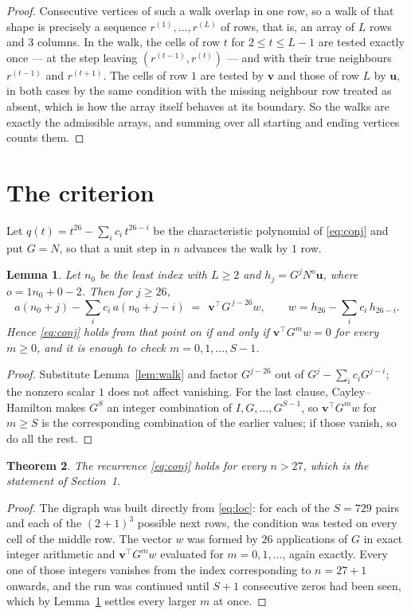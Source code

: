 \documentclass[11pt,a4paper]{article}
\theoremstyle{plain}
\newtheorem{theorem}{Theorem}
\newtheorem{lemma}[theorem]{Lemma}
\theoremstyle{definition}
\begin{document}
\begin{proof}
Consecutive vertices of such a walk overlap in one row, so a walk of that shape is
precisely a sequence $r^{(1)},\dots,r^{(L)}$ of rows, that is, an array of $L$ rows
and $3$ columns. In the walk, the cells of row $t$ for $2\le t\le L-1$ are tested
exactly once --- at the step leaving $(r^{(t-1)},r^{(t)})$ --- and with their true
neighbours $r^{(t-1)}$ and $r^{(t+1)}$. The cells of row $1$ are tested by
$\mathbf{v}$ and those of row $L$ by $\mathbf{u}$, in both cases by the same condition
with the missing neighbour row treated as absent, which is how the array itself behaves at
its boundary. So the walks are exactly the admissible arrays, and summing over all starting
and ending vertices counts them.
\end{proof}

\section{The criterion}

Let $q(t)=t^{26}-\sum_i c_i\,t^{26-i}$ be the characteristic polynomial of
\eqref{eq:conj} and put $G=N$, so that a unit step in $n$ advances the walk by
$1$ row.

\begin{lemma}\label{lem:crit}
Let $n_0$ be the least index with $L\ge2$ and $h_j=G^{j}N^{o}\mathbf{u}$, where
$o=1n_0+0-2$. Then for $j\ge26$,
\[
a(n_0+j)-\sum_i c_i\,a(n_0+j-i)\;=\;\,\mathbf{v}^{\!\top}G^{\,j-26}w,
\qquad w=h_{26}-\sum_i c_i\,h_{26-i} .
\]
Hence \eqref{eq:conj} holds from that point on if and only if
$\mathbf{v}^{\!\top}G^{m}w=0$ for every $m\ge0$, and it is enough to check
$m=0,1,\dots,S-1$.
\end{lemma}

\begin{proof}
Substitute Lemma~\ref{lem:walk} and factor $G^{j-26}$ out of
$G^{j}-\sum_ic_iG^{j-i}$; the nonzero scalar $1$ does not affect
vanishing. For the last clause, Cayley--Hamilton makes $G^{S}$ an integer combination of
$I,G,\dots,G^{S-1}$, so $\mathbf{v}^{\!\top}G^{m}w$ for $m\ge S$ is the corresponding
combination of the earlier values; if those vanish, so do all the rest.
\end{proof}

\begin{theorem}
The recurrence \eqref{eq:conj} holds for every $n>27$, which is the statement of
Section~1.
\end{theorem}

\begin{proof}
The digraph was built directly from \eqref{eq:loc}: for each of the $S=729$ pairs and each
of the $(2+1)^{3}$ possible next rows, the condition was tested on every cell of
the middle row. The vector $w$ was formed by $26$ applications of $G$ in exact integer
arithmetic and $\mathbf{v}^{\!\top}G^{m}w$ evaluated for $m=0,1,\dots$, again exactly.
Every one of those integers vanishes from the index corresponding to $n=27+1$ onwards,
and the run was continued until $S+1$ consecutive zeros had been seen, which by
Lemma~\ref{lem:crit} settles every larger $m$ at once.
\end{proof}
\end{document}
